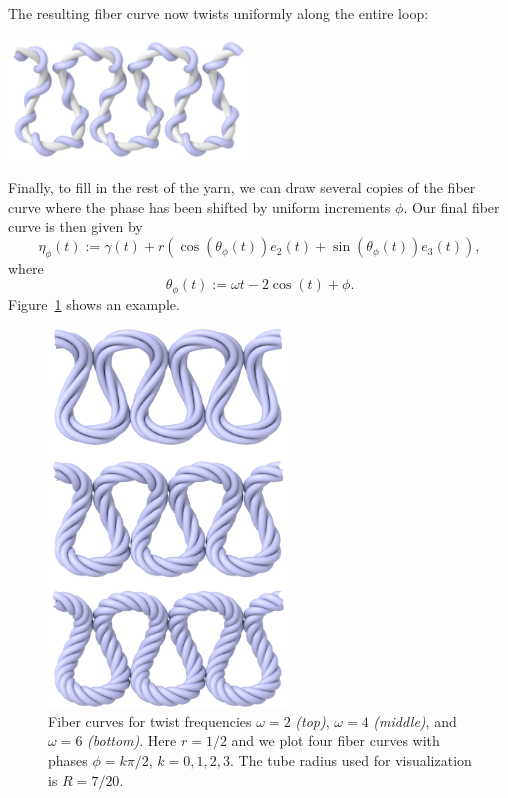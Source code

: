 \documentclass{article}
\begin{document}
The resulting fiber curve now twists uniformly along the entire loop:
\begin{center}
   \includegraphics[width=2.5in]{images/fiber-even.jpg}
\end{center}
Finally, to fill in the rest of the yarn, we can draw several copies of the fiber curve where the phase has been shifted by uniform increments \(\phi\).  Our final fiber curve is then given by
\begin{equation}
   \label{eq:FiberCurve}
   \boxed{\eta_\phi(t) := \gamma(t) + r( \cos(\theta_\phi(t)) e_2(t) + \sin(\theta_\phi(t)) e_3(t) ),}
\end{equation}
where
\[ 
      \theta_\phi(t) := \omega t - 2\cos(t) + \phi.
\]
Figure~\ref{fig:fibers-example} shows an example.

\begin{figure}[h!]
   \centering
   \includegraphics[width=2.5in]{images/fibers-example.jpg}
   \caption{Fiber curves for twist frequencies \(\omega = 2\) \emph{(top)}, \(\omega = 4\) \emph{(middle)}, and \(\omega = 6\) \emph{(bottom)}.  Here \(r = 1/2\) and we plot four fiber curves with phases \(\phi = k\pi/2\), \(k=0,1,2,3\).  The tube radius used for visualization is \(R = 7/20\).\label{fig:fibers-example}}
\end{figure}
\end{document}
